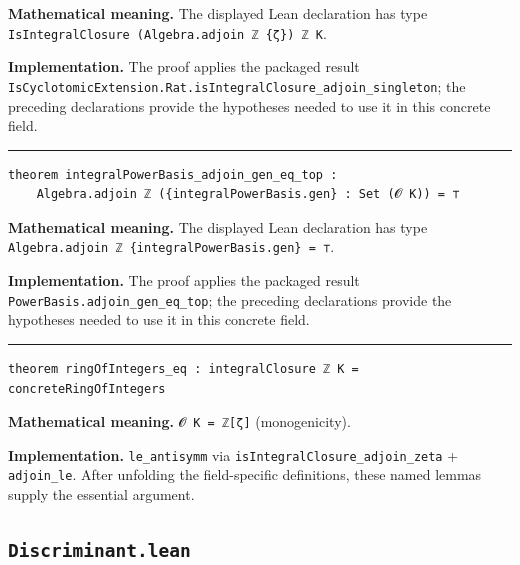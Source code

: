 \documentclass[UTF8,a4paper,11pt,fontset=fandol]{ctexart}
\theoremstyle{definition}
\newcommand{\statementsep}{\par\medskip\hrule\medskip}
\begin{document}
\noindent\textbf{Mathematical meaning.} The displayed Lean declaration has type \texttt{IsIntegralClosure (Algebra.\allowbreak{}adjoin ℤ \{ζ\}) ℤ K}.\par
\noindent\textbf{Implementation.} The proof applies the packaged result \texttt{IsCyclotomicExtension.\allowbreak{}Rat.\allowbreak{}isIntegralClosure\_\allowbreak{}adjoin\_\allowbreak{}singleton}; the preceding declarations provide the hypotheses needed to use it in this concrete field.\par
\statementsep
\begin{verbatim}
theorem integralPowerBasis_adjoin_gen_eq_top :
    Algebra.adjoin ℤ ({integralPowerBasis.gen} : Set (𝓞 K)) = ⊤
\end{verbatim}
\noindent\textbf{Mathematical meaning.} The displayed Lean declaration has type \texttt{Algebra.\allowbreak{}adjoin ℤ \{integralPowerBasis.\allowbreak{}gen\} = ⊤}.\par
\noindent\textbf{Implementation.} The proof applies the packaged result \texttt{PowerBasis.\allowbreak{}adjoin\_\allowbreak{}gen\_\allowbreak{}eq\_\allowbreak{}top}; the preceding declarations provide the hypotheses needed to use it in this concrete field.\par
\statementsep
\begin{verbatim}
theorem ringOfIntegers_eq : integralClosure ℤ K = concreteRingOfIntegers
\end{verbatim}
\noindent\textbf{Mathematical meaning.} \texttt{𝓞 K = ℤ[ζ]} (monogenicity).\par
\noindent\textbf{Implementation.} \texttt{le\_\allowbreak{}antisymm} via \texttt{isIntegralClosure\_\allowbreak{}adjoin\_\allowbreak{}zeta} + \texttt{adjoin\_\allowbreak{}le}. After unfolding the field-specific definitions, these named lemmas supply the essential argument.\par

\subsection{\texttt{Discriminant.lean}}
\end{document}
